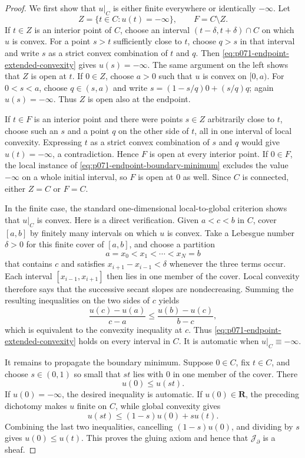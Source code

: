 \begin{proof}
We first show that \(u|_C\) is either finite everywhere or identically
\(-\infty\).  Let
\[
 Z=\{t\in C:u(t)=-\infty\},
 \qquad
 F=C\setminus Z.
\]
If \(t\in Z\) is an interior point of \(C\), choose an interval
\((t-\delta,t+\delta)\cap C\) on which \(u\) is convex.  For a point
\(s>t\) sufficiently close to \(t\), choose \(q>s\) in that interval and
write \(s\) as a strict convex combination of \(t\) and \(q\).
Then \eqref{eq:p071-endpoint-extended-convexity} gives \(u(s)=-\infty\).
The same argument on the left shows that \(Z\) is open at \(t\).  If
\(0\in Z\), choose \(a>0\) such that \(u\) is convex on \([0,a)\).
For \(0<s<a\), choose \(q\in(s,a)\) and write
\(s=(1-s/q)0+(s/q)q\); again \(u(s)=-\infty\).  Thus \(Z\) is open also
at the endpoint.

If \(t\in F\) is an interior point and there were points \(s\in Z\)
arbitrarily close to \(t\), choose such an \(s\) and a point \(q\) on the
other side of \(t\), all in one interval of local convexity.  Expressing
\(t\) as a strict convex combination of \(s\) and \(q\) would give
\(u(t)=-\infty\), a contradiction.  Hence \(F\) is open at every interior
point.  If \(0\in F\), the local instance of
\eqref{eq:p071-endpoint-boundary-minimum} excludes the value
\(-\infty\) on a whole initial interval, so \(F\) is open at \(0\) as
well.  Since \(C\) is connected, either \(Z=C\) or \(F=C\).

In the finite case, the standard one-dimensional local-to-global
criterion shows that \(u|_C\) is convex.  Here is a direct verification.
Given \(a<c<b\) in \(C\), cover \([a,b]\) by finitely many intervals on
which \(u\) is convex.  Take a Lebesgue number \(\delta>0\) for this finite
cover of \([a,b]\), and choose a partition
\[
             a=x_0<x_1<\cdots<x_N=b
\]
that contains \(c\) and satisfies
\(x_{i+1}-x_{i-1}<\delta\) whenever the three terms occur.  Each interval
\([x_{i-1},x_{i+1}]\) then lies in one member of the cover.  Local convexity
therefore says that the successive secant slopes are nondecreasing.  Summing
the resulting inequalities on the two sides of \(c\) yields
\[
 \frac{u(c)-u(a)}{c-a}
 \leq
 \frac{u(b)-u(c)}{b-c},
\]
which is equivalent to the convexity inequality at \(c\).  Thus
\eqref{eq:p071-endpoint-extended-convexity} holds on every interval in
\(C\).  It is automatic when \(u|_C\equiv-\infty\).

It remains to propagate the boundary minimum.  Suppose \(0\in C\), fix
\(t\in C\), and choose \(s\in(0,1)\) so small that \(st\) lies with \(0\)
in one member of the cover.  There
\[
                              u(0)\leq u(st).
\]
If \(u(0)=-\infty\), the desired inequality is automatic.  If
\(u(0)\in\mathbf R\), the preceding dichotomy makes \(u\) finite on
\(C\), while global convexity gives
\[
                 u(st)\leq(1-s)u(0)+s u(t).
\]
Combining the last two inequalities, cancelling \((1-s)u(0)\), and
dividing by \(s\) gives \(u(0)\leq u(t)\).  This proves the gluing axiom
and hence that \(\mathscr J_{\partial}\) is a sheaf.


\end{proof}
